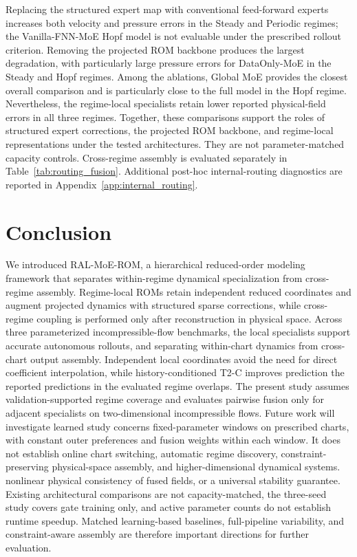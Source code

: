 \documentclass{article}
\providecommand{\DIFaddtex}[1]{{\protect\color{blue} \sf #1}} %
\providecommand{\DIFdeltex}[1]{{\protect\color{red} \scriptsize #1}} %
\providecommand{\DIFaddbegin}{} %
\providecommand{\DIFaddend}{} %
\providecommand{\DIFdelbegin}{} %
\providecommand{\DIFdelend}{} %
\providecommand{\DIFadd}[1]{\texorpdfstring{\DIFaddtex{#1}}{#1}} %
\providecommand{\DIFdel}[1]{\texorpdfstring{\DIFdeltex{#1}}{}} %
\providecommand{\DIFscaledelfig}{0.5}
\newlength{\DIFdelgraphicswidth} %
\newlength{\DIFdelgraphicsheight} %
\providecommand{\DIFaddincludegraphics}[2][]{{\color{blue}\fbox{\DIFOincludegraphics[#1]{#2}}}} %
\providecommand{\DIFdelincludegraphics}[2][]{%
\sbox{\DIFdelgraphicsbox}{\DIFOincludegraphics[#1]{#2}}%
\settoboxwidth{\DIFdelgraphicswidth}{\DIFdelgraphicsbox} %
\settoboxtotalheight{\DIFdelgraphicsheight}{\DIFdelgraphicsbox} %
\scalebox{\DIFscaledelfig}{%
\parbox[b]{\DIFdelgraphicswidth}{\usebox{\DIFdelgraphicsbox}\\[-\baselineskip] \rule{\DIFdelgraphicswidth}{0em}}\llap{\resizebox{\DIFdelgraphicswidth}{\DIFdelgraphicsheight}{%
\setlength{\unitlength}{\DIFdelgraphicswidth}%
\begin{picture}(1,1)%
\thicklines\linethickness{2pt} %
{\color[rgb]{1,0,0}\put(0,0){\framebox(1,1){}}}%
{\color[rgb]{1,0,0}\put(0,0){\line( 1,1){1}}}%
{\color[rgb]{1,0,0}\put(0,1){\line(1,-1){1}}}%
\end{picture}%
}\hspace*{3pt}}} %
} %
\DeclareRobustCommand{\DIFaddbegin}{\DIFOaddbegin \let\includegraphics\DIFaddincludegraphics} %
\DeclareRobustCommand{\DIFaddend}{\DIFOaddend \let\includegraphics\DIFOincludegraphics} %
\DeclareRobustCommand{\DIFdelbegin}{\DIFOdelbegin \let\includegraphics\DIFdelincludegraphics} %
\DeclareRobustCommand{\DIFdelend}{\DIFOaddend \let\includegraphics\DIFOincludegraphics} %
\begin{document}
Replacing the structured expert map with conventional feed-forward experts increases both velocity and pressure errors in the Steady and Periodic regimes; the Vanilla-FNN-MoE Hopf model is not evaluable under the prescribed rollout criterion. Removing the projected ROM backbone produces the largest degradation, with particularly large pressure errors for DataOnly-MoE in the Steady and Hopf regimes. Among the ablations, Global MoE provides the closest overall comparison and is particularly close to the full model in the Hopf regime. Nevertheless, the regime-local specialists retain lower reported physical-field errors in all three regimes. Together, these comparisons support the roles of structured expert corrections, the projected ROM backbone, and regime-local representations under the tested architectures. They are not parameter-matched capacity controls. Cross-regime assembly is evaluated separately in Table~\ref{tab:routing_fusion}. Additional post-hoc internal-routing diagnostics are reported in
Appendix~\ref{app:internal_routing}.



\FloatBarrier
\section{Conclusion}

We introduced RAL-MoE-ROM, a hierarchical reduced-order modeling framework \DIFdelbegin \DIFdel{that separates within-regime dynamical specialization from cross-regime assembly. Regime-local ROMs retain independent reduced coordinates and augment projected dynamics with structured sparse corrections, while
cross-regime coupling is performed only after reconstruction in physical space. Across three parameterized incompressible-flow benchmarks, the local specialists support accurate autonomous rollouts, and }\DIFdelend \DIFaddbegin \DIFadd{separating within-chart dynamics from cross-chart output assembly. Independent local coordinates avoid the need for direct coefficient interpolation, while }\DIFaddend history-conditioned T2-C improves \DIFdelbegin \DIFdel{prediction }\DIFdelend \DIFaddbegin \DIFadd{the reported predictions }\DIFaddend in the evaluated \DIFdelbegin \DIFdel{regime }\DIFdelend overlaps. The \DIFdelbegin \DIFdel{present study assumes validation-supported regime coverage and evaluates pairwise fusion only for adjacent specialists on two-dimensional incompressible flows. Future work will investigate learned }\DIFdelend \DIFaddbegin \DIFadd{study concerns fixed-parameter windows on prescribed charts, with constant outer preferences and fusion weights within each window. It does not establish online chart switching, automatic }\DIFaddend regime discovery, \DIFdelbegin \DIFdel{constraint-preserving physical-space assembly, and higher-dimensional dynamical systems. }\DIFdelend \DIFaddbegin \DIFadd{nonlinear physical consistency of fused fields, or a universal stability guarantee. Existing architectural comparisons are not capacity-matched, the three-seed study covers gate training only, and active parameter counts do not establish runtime speedup. Matched learning-based baselines, full-pipeline variability, and constraint-aware assembly are therefore important directions for further evaluation.
}\DIFaddend 
\end{document}
